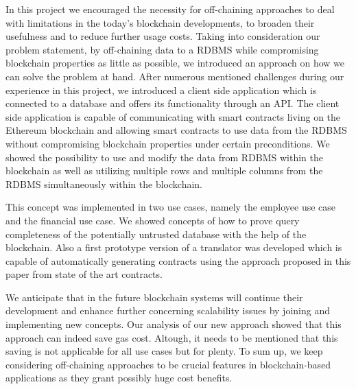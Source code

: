 
In this project we encouraged the necessity for off-chaining approaches to deal with limitations in the today’s blockchain developments, to broaden their usefulness and to reduce further usage costs. 
Taking into consideration our problem statement, by off-chaining data to a RDBMS while compromising blockchain properties as little as possible, we introduced an approach on how we can solve the problem at hand.
 After numerous mentioned challenges during our experience in this project, we introduced a client side application which is connected to a database and offers its functionality through an API.
The client side application is capable of communicating with smart contracts living on the Ethereum blockchain and allowing smart contracts to use data from the RDBMS without compromising blockchain properties under certain preconditions. 
We showed the possibility to use and modify the data from RDBMS within the blockchain as well as utilizing multiple rows and multiple columns from the RDBMS simultaneously within the blockchain.

This concept was implemented in two use cases, namely the employee use case and the financial use case.
We showed concepts of how to prove query completeness of the potentially untrusted database with the help of the blockchain.
Also a first prototype version of a translator was developed which is capable of automatically generating contracts using the approach proposed in this paper from state of the art contracts.


We anticipate that in the future blockchain systems will continue their development and enhance further concerning scalability issues by joining and implementing new concepts. 
Our analysis of our new approach showed that this approach can indeed save gas cost.
Altough, it needs to be mentioned that this saving is not applicable for all use cases but for plenty.
To sum up, we keep considering off-chaining approaches to be crucial features in blockchain-based applications as they grant possibly huge cost benefits.






